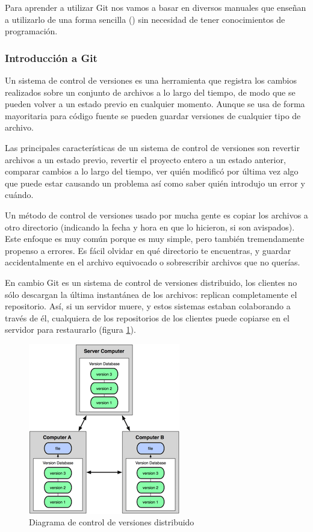 \bigskip
Para aprender a utilizar Git nos vamos a basar en diversos manuales que enseñan a utilizarlo de una forma sencilla (\cite{popov_control_2012}) sin necesidad de tener conocimientos de programación.

\subsubsection{Introducción a Git}

Un sistema de control de versiones es una herramienta que registra los cambios realizados sobre un conjunto de archivos a lo largo del tiempo, de modo que se pueden volver a un estado previo en cualquier momento. Aunque se usa de forma mayoritaria para código fuente  se pueden guardar versiones de cualquier tipo de archivo.

Las principales características de un sistema de control de versiones son revertir archivos a un estado previo, revertir el proyecto entero a un estado anterior, comparar cambios a lo largo del tiempo, ver quién modificó por última vez algo que puede estar causando un problema así como saber quién introdujo un error y cuándo.

Un método de control de versiones usado por mucha gente es copiar los archivos a otro directorio (indicando la fecha y hora en que lo hicieron, si son avispados). Este enfoque es muy común porque es muy simple, pero también tremendamente propenso a errores. Es fácil olvidar en qué directorio te encuentras, y guardar accidentalmente en el archivo equivocado o sobrescribir archivos que no querías.

En cambio Git es un sistema de control de versiones distribuido, los clientes no sólo descargan la última instantánea de los archivos: replican completamente el repositorio. Así, si un servidor muere, y estos sistemas estaban colaborando a través de él, cualquiera de los repositorios de los clientes puede copiarse en el servidor para restaurarlo (figura \ref{fig:dvcs}).

\begin{figure}[h!]
\centering
\includegraphics{../images/dvcs}
\caption{Diagrama de control de versiones distribuido}
\label{fig:dvcs}
\end{figure}

